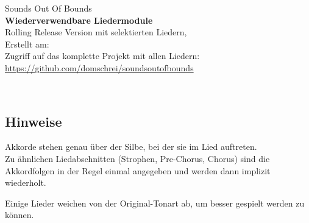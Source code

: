 
\vspace*{6cm} 
{\Large Sounds Out Of Bounds}\\
\textbf{Wiederverwendbare Liedermodule}\\

Rolling Release Version mit selektierten Liedern,\\
Erstellt am:  
\ \\

Zugriff auf das komplette Projekt mit allen Liedern:\\
\url{https://github.com/domschrei/soundsoutofbounds}

\ \\

\subsection*{Hinweise}



Akkorde stehen genau über der Silbe, bei der sie im Lied auftreten.\\

Zu ähnlichen Liedabschnitten (Strophen, Pre-Chorus, Chorus) sind die Akkordfolgen in der Regel einmal angegeben und werden dann implizit wiederholt.

Einige Lieder weichen von der Original-Tonart ab, um besser gespielt werden zu können.

\pagebreak 

